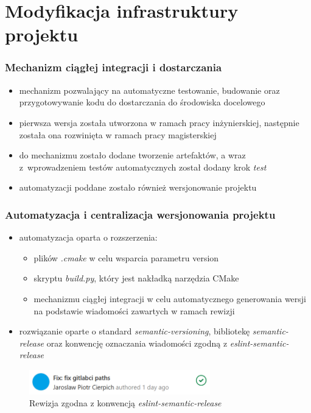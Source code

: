 \documentclass[10pt]{beamer}
\begin{document}
\section{Modyfikacja infrastruktury projektu}

\begin{frame}
\frametitle{Mechanizm ciągłej integracji i dostarczania}
    \begin{itemize}
        \item mechanizm pozwalający na automatyczne testowanie, budowanie oraz przygotowywanie kodu do dostarczania do środowiska docelowego
        \item pierwsza wersja została utworzona w ramach pracy inżynierskiej, następnie została ona rozwinięta w ramach pracy magisterskiej
        \item do mechanizmu zostało dodane tworzenie artefaktów, a wraz z~wprowadzeniem testów automatycznych został dodany krok \emph{test}
        \item automatyzacji poddane zostało również wersjonowanie projektu
    \end{itemize}
\end{frame}

\begin{frame}
\frametitle{Automatyzacja i centralizacja wersjonowania projektu}
    \begin{itemize}
        \item automatyzacja oparta o rozszerzenia:
            \begin{itemize}
                \item plików \emph{.cmake} w celu wsparcia parametru version
                \item skryptu \emph{build.py}, który jest nakładką narzędzia CMake
                \item mechanizmu ciągłej integracji w celu automatycznego generowania wersji na podstawie wiadomości zawartych w ramach rewizji
            \end{itemize}
        \item rozwiązanie oparte o standard \emph{semantic-versioning}, bibliotekę \emph{semantic-release} oraz konwencję oznaczania wiadomości zgodną z \emph{eslint-semantic-release}
    \end{itemize}
\begin{figure}
    \includegraphics[width=0.7\textwidth]{static/commit}
    \caption{Rewizja zgodna z konwencją \emph{eslint-semantic-release}}
\end{figure}
\end{frame}
\end{document}
